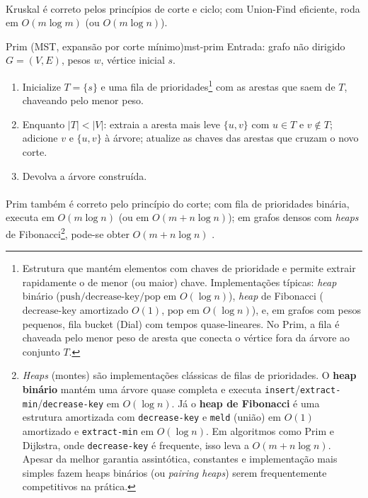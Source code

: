 \documentclass[12pt,a4paper]{article}
\begin{document}
\paragraph{}Kruskal é correto pelos princípios de corte e ciclo; com Union-Find eficiente, roda em \(O(m\log m)\) (ou \(O(m\log n)\)).

\begin{algobox}{Prim (MST, expansão por corte mínimo)}{mst-prim}
Entrada: grafo não dirigido \(G=(V,E)\), pesos \(w\), vértice inicial \(s\).
\begin{enumerate}\setlength{\itemsep}{2pt}
    \item Inicialize \(T=\{s\}\) e uma fila de prioridades\footnote{Estrutura que mantém elementos com chaves de prioridade e permite extrair rapidamente o de menor (ou maior) chave. Implementações típicas: \emph{heap} binário (\(\mathrm{push}/\mathrm{decrease\text{-}key}/\mathrm{pop}\) em \(O(\log n)\)), \emph{heap} de Fibonacci (\(\mathrm{decrease\text{-}key}\) amortizado \(O(1)\), \(\mathrm{pop}\) em \(O(\log n)\)), e, em grafos com pesos pequenos, fila bucket (Dial) com tempos quase-lineares. No Prim, a fila é chaveada pelo menor peso de aresta que conecta o vértice fora da árvore ao conjunto \(T\).} com as arestas que saem de \(T\), chaveando pelo menor peso.
    \item Enquanto \(|T|<|V|\): extraia a aresta mais leve \(\{u,v\}\) com \(u\in T\) e \(v\notin T\); adicione \(v\) e \(\{u,v\}\) à árvore; atualize as chaves das arestas que cruzam o novo corte.
    \item Devolva a árvore construída.
\end{enumerate}
\end{algobox}

\paragraph{}Prim também é correto pelo princípio do corte; com fila de prioridades binária, executa em \(O(m\log n)\) (ou em \(O(m+n\log n)\)); em grafos densos com \emph{heaps} de Fibonacci\footnote{\emph{Heaps} (montes) são implementações clássicas de filas de prioridades. O \textbf{heap binário} mantém uma árvore quase completa e executa \texttt{insert}/\texttt{extract-min}/\texttt{decrease-key} em \(O(\log n)\). Já o \textbf{heap de Fibonacci} é uma estrutura amortizada com \texttt{decrease-key} e \texttt{meld} (união) em \(O(1)\) amortizado e \texttt{extract-min} em \(O(\log n)\). Em algoritmos como Prim e Dijkstra, onde \texttt{decrease-key} é frequente, isso leva a \(O(m+n\log n)\). Apesar da melhor garantia assintótica, constantes e implementação mais simples fazem heaps binários (ou \emph{pairing heaps}) serem frequentemente competitivos na prática.}, pode-se obter \(O(m+n\log n)\) \cite{cormen2009,kleinberg2006,west2001introduction,diestel2017graph}.
\end{document}
